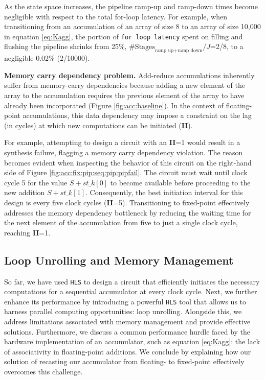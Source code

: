 \documentclass[12pt,american]{article}
\begin{document}
As the state space increases, the pipeline ramp-up and ramp-down times become negligible with respect to the total for-loop latency. For example, when transitioning from an accumulation of an array of size 8 to an array of size 10,000 in equation \eqref{eq:Kagg}, the portion of \texttt{for loop latency} spent on filling and flushing the pipeline shrinks from 25\%, $\#\text{Stages}_{\text{ramp up+ramp down}}/J$=2/8, to a negligible 0.02\% (2/10000).

\noindent \textbf{Memory carry dependency problem.} Add-reduce accumulations inherently suffer from memory-carry dependencies because adding a new element of the array to the accumulation requires the previous element of the array to have already been incorporated (Figure \ref{fig:acc:baseline}). In the context of floating-point accumulations, this data dependency may impose a constraint on the lag (in cycles) at which new computations can be initiated (\textbf{II}).

For example, attempting to design a circuit with an \textbf{II}=1 would result in a synthesis failure, flagging a memory carry dependency violation. The reason becomes evident when inspecting the behavior of this circuit on the right-hand side of Figure \ref{fig:acc:fix:pip:seq:pip:pipfail}. The circuit must wait until clock cycle 5 for the value $S+st\_k[0]$ to become available before proceeding to the new addition $S+st\_k[1]$. Consequently, the best initiation interval for this design is every five clock cycles (\textbf{II}=5). Transitioning to fixed-point effectively addresses the memory dependency bottleneck by reducing the waiting time for the next element of the accumulation from five to just a single clock cycle, reaching \textbf{II}=1. 

\subsection{Loop Unrolling and Memory Management}\label{sec:acc:unroll}

So far, we have used \texttt{HLS} to design a circuit that efficiently initiates the necessary computations for a sequential accumulator at every clock cycle. Next, we further enhance its performance by introducing a powerful \texttt{HLS} tool that allows us to harness parallel computing opportunities: loop unrolling.
Alongside this, we address limitations associated with memory management and provide effective solutions. Furthermore, we discuss a common performance hurdle faced by the hardware implementation of an accumulator, such as equation \eqref{eq:Kagg}: the lack of associativity in floating-point additions. We conclude by explaining how our solution of recasting our accumulator from floating- to fixed-point effectively overcomes this challenge.
\end{document}
